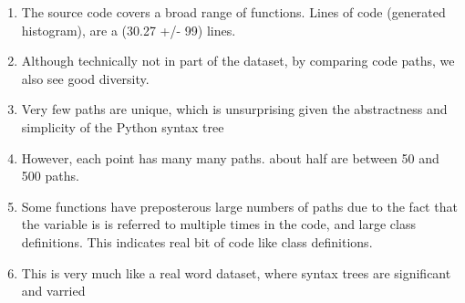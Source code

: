 \begin{enumerate}
    \item The source code covers a broad range of functions. Lines of code (generated histogram), are a (30.27 +/- 99) lines. 
    \item Although technically not in part of the dataset, by comparing code paths, we also see good diversity. 
    \item Very few paths are unique, which is unsurprising given the abstractness and simplicity of the Python syntax tree
    \item However, each point has many many paths.  about half are between 50 and 500 paths.
    \item  Some functions have preposterous large numbers of paths due to the fact that the variable is is referred to multiple times in the code, and large class definitions. This indicates real bit of code like class definitions.
    \item This is very much like a real word dataset, where syntax trees are significant and varried
\end{enumerate}





